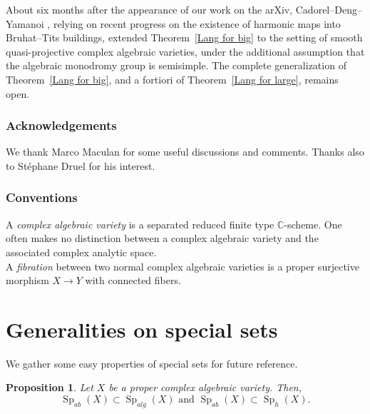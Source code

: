 \documentclass[11pt,letterpaper]{amsart}
\def\bC{\mathbb{C}}
\theoremstyle{plain}
\newtheorem{prop}[thm]{Proposition}
\DeclareMathOperator{\Sp}{Sp}
\begin{document}
About six months after the appearance of our work on the arXiv, Cadorel--Deng--Yamanoi \cite{CDY}, relying on recent progress on the existence of harmonic maps into Bruhat–Tits buildings, extended Theorem~\ref{Lang for big} to the setting of smooth quasi-projective complex algebraic varieties, under the additional assumption that the algebraic monodromy group is semisimple. The complete generalization of Theorem~\ref{Lang for big}, and a fortiori of Theorem~\ref{Lang for large}, remains open.


 \subsubsection*{Acknowledgements} We thank Marco Maculan for some useful discussions and comments. Thanks also to Stéphane Druel for his interest.



\subsubsection*{Conventions} A \emph{complex algebraic variety} is a separated reduced finite type $\bC$-scheme. One often makes no distinction between a complex algebraic variety and the associated complex analytic space.\\
A \emph{fibration} between two normal complex algebraic varieties is a proper surjective morphism $X \to Y$ with connected fibers.





\section{Generalities on special sets}

We gather some easy properties of special sets for future reference.

\begin{prop}\label{trivial inclusions}
Let $X$ be a proper complex algebraic variety. Then, 
\[\Sp_{ab}(X) \subset \Sp_{alg}(X) \text{ and }\Sp_{ab}(X) \subset \Sp_h(X).\]
\end{prop}
\end{document}

